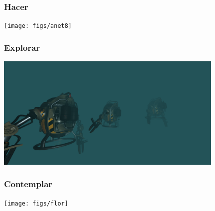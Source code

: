 \begin{frame}[fragile]
  \frametitle{Hacer}

  \begin{center}
  \texttt{[image: figs/anet8]}
  \end{center}  
  
\end{frame}

\begin{frame}[fragile]
  \frametitle{Explorar}

  \begin{center}
  \includegraphics[width=11cm]{figs/aframe-robots}
  \end{center}  
  
\end{frame}

\begin{frame}[fragile]
  \frametitle{Contemplar}

  \begin{center}
  \texttt{[image: figs/flor]}
  \end{center} 
  
\end{frame}
